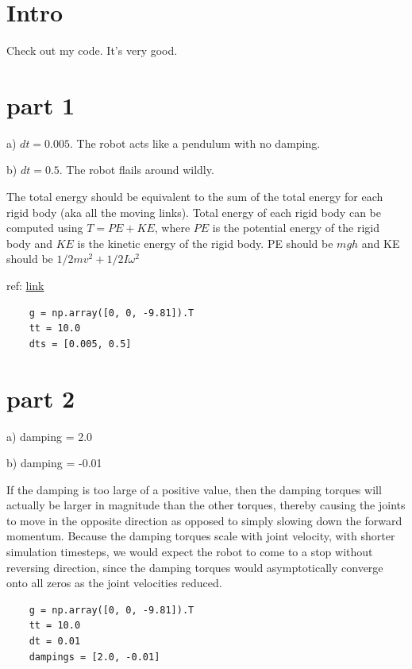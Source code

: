 \documentclass[11pt]{article}
\begin{document}
 
\onehalfspacing

\section{Intro}
Check out my code. It's very good.

\section{part 1}
a) $dt = 0.005$. The robot acts like a pendulum with no damping.

b) $dt = 0.5$. The robot flails around wildly.

The total energy should be equivalent to the sum of the total energy for each rigid body (aka all the moving links). Total energy of each rigid body can be computed using $T = PE + KE$, where $PE$ is the potential energy of the rigid body and $KE$ is the kinetic energy of the rigid body. PE should be $mgh$ and KE should be $1/2 mv^2 + 1/2 I \omega^2$

ref: \href{https://eng.libretexts.org/Bookshelves/Mechanical_Engineering/Mechanics_Map_(Moore_et_al.)/13%3A_Work_and_Energy_in_Rigid_Bodies/13.01%3A_Conservation_of_Energy_for_Rigid_Bodies}{link}


\begin{verbatim}
    g = np.array([0, 0, -9.81]).T
    tt = 10.0
    dts = [0.005, 0.5]
\end{verbatim}



\section{part 2}
a) damping = 2.0

b) damping = -0.01

If the damping is too large of a positive value, then the damping torques will actually be larger in magnitude than the other torques, thereby causing the joints to move in the opposite direction as opposed to simply slowing down the forward momentum. Because the damping torques scale with joint velocity, with shorter simulation timesteps, we would expect the robot to come to a stop without reversing direction, since the damping torques would asymptotically converge onto all zeros as the joint velocities reduced.

\begin{verbatim}
    g = np.array([0, 0, -9.81]).T
    tt = 10.0
    dt = 0.01
    dampings = [2.0, -0.01]
\end{verbatim}
\end{document}
